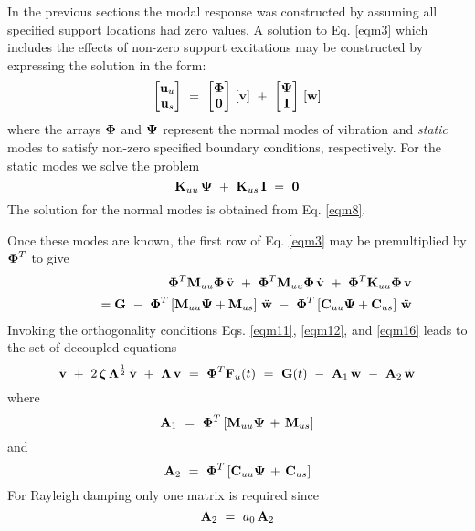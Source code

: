 In the previous sections the modal response was constructed by assuming
all specified support locations had zero values.
A solution to Eq. \ref{eqm3} which includes the effects
of non-zero support excitations may be constructed by expressing the solution
in the form:
\begin{equation}
\label{eqs1}
\left[ \begin{matrix} \mathbf{u}_u \\ \mathbf{u}_s \end{matrix} \right] ~=~
\left[ \begin{matrix} \boldsymbol{\Phi} \\ \mathbf{0} \end{matrix} \right] \,
\left[ \mathbf{v} \right] ~+~
\left[ \begin{matrix} \boldsymbol{\Psi} \\ \mathbf{I} \end{matrix} \right] \,
\left[ \mathbf{w} \right]
\end{equation}
where the arrays $\boldsymbol{\Phi}$ and $\boldsymbol{\Psi}$ represent the normal modes of
vibration and {\it static} modes to satisfy non-zero specified boundary
conditions, respectively.  For the static modes we solve the problem
\begin{equation}
\label{eqs2}
\mathbf{K}_{uu} \, \boldsymbol{\Psi} ~+~ \mathbf{K}_{us} \, \mathbf{I} ~=~ \mathbf{0}
\end{equation}
The solution for the normal modes is obtained from Eq. \ref{eqm8}.

Once these modes are known, the first row of Eq. \ref{eqm3} may be premultiplied
by $\boldsymbol{\Phi}^T$ to give
\begin{eqnarray}
\label{eqs3}
&& \boldsymbol{\Phi}^T \mathbf{M}_{uu} \boldsymbol{\Phi} \, \ddot{\mathbf{v}} ~+~
\boldsymbol{\Phi}^T \mathbf{M}_{uu} \boldsymbol{\Phi} \, \dot{\mathbf{v}} ~+~
\boldsymbol{\Phi}^T \mathbf{K}_{uu} \boldsymbol{\Phi} \, \mathbf{v} \nonumber \\
&& \qquad= \mathbf{G} ~-~
\boldsymbol{\Phi}^T \left[ \mathbf{M}_{uu} \boldsymbol{\Psi}
+ \mathbf{M}_{us} \right] \, \ddot{\mathbf{w}} ~-~
\boldsymbol{\Phi}^T \left[ \mathbf{C}_{uu} \boldsymbol{\Psi}
+ \mathbf{C}_{us} \right] \, \ddot{\mathbf{w}}
\end{eqnarray}
Invoking the orthogonality conditions Eqs. \ref{eqm11}, \ref{eqm12},
and \ref{eqm16} leads to the set of decoupled
equations
\begin{equation}
\label{eqs4}
\ddot{\mathbf{v}} ~+~ 2 \, \boldsymbol{\zeta} \, \boldsymbol{\Lambda}^\frac{1}{2} \, \dot{\mathbf{v}}
~+~ \boldsymbol{\Lambda} \, \mathbf{v} ~=~ \boldsymbol{\Phi}^T \mathbf{F}_u(t) ~=~ \mathbf{G}(t) ~-~
\mathbf{A}_1 \, \ddot{\mathbf{w}} ~-~ \mathbf{A}_2 \, \dot{\mathbf{w}}
\end{equation}
where
\begin{equation}
\label{eqs5}
\mathbf{A}_1  ~=~
\boldsymbol{\Phi}^T \left[ \mathbf{M}_{uu} \boldsymbol{\Psi} \, + \, \mathbf{M}_{us} \right]
\end{equation}
and
\begin{equation}
\label{eqs6}
\mathbf{A}_2  ~=~
\boldsymbol{\Phi}^T \left[ \mathbf{C}_{uu} \boldsymbol{\Psi} \, + \, \mathbf{C}_{us} \right]
\end{equation}
For Rayleigh damping only one matrix is required since
\begin{equation}
\label{eqs6a}
\mathbf{A}_2  ~=~ a_0 \, \mathbf{A}_2
\end{equation}


